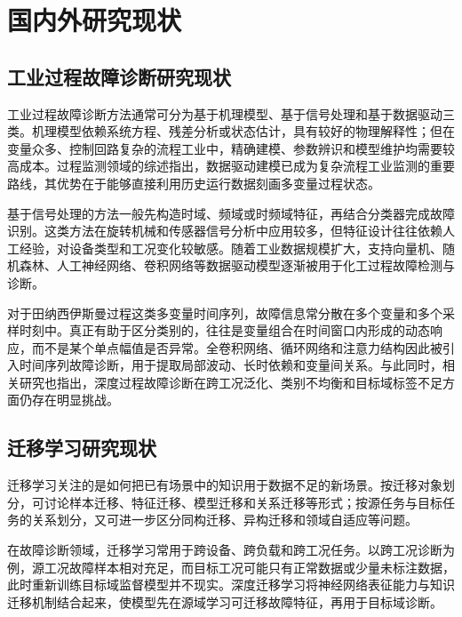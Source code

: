 \documentclass{seuthesis-2022}
\begin{document}
\section{国内外研究现状}

\subsection{工业过程故障诊断研究现状}

工业过程故障诊断方法通常可分为基于机理模型、基于信号处理和基于数据驱动三类。机理模型依赖系统方程、残差分析或状态估计，具有较好的物理解释性；但在变量众多、控制回路复杂的流程工业中，精确建模、参数辨识和模型维护均需要较高成本。过程监测领域的综述指出，数据驱动建模已成为复杂流程工业监测的重要路线，其优势在于能够直接利用历史运行数据刻画多变量过程状态\cite{qin2012survey,ge2017review}。

基于信号处理的方法一般先构造时域、频域或时频域特征，再结合分类器完成故障识别。这类方法在旋转机械和传感器信号分析中应用较多，但特征设计往往依赖人工经验，对设备类型和工况变化较敏感。随着工业数据规模扩大，支持向量机、随机森林、人工神经网络、卷积网络等数据驱动模型逐渐被用于化工过程故障检测与诊断\cite{lei2020applications,taqvi2021review,wang2025comprehensive}。

对于田纳西伊斯曼过程这类多变量时间序列，故障信息常分散在多个变量和多个采样时刻中。真正有助于区分类别的，往往是变量组合在时间窗口内形成的动态响应，而不是某个单点幅值是否异常。全卷积网络、循环网络和注意力结构因此被引入时间序列故障诊断，用于提取局部波动、长时依赖和变量间关系。与此同时，相关研究也指出，深度过程故障诊断在跨工况泛化、类别不均衡和目标域标签不足方面仍存在明显挑战\cite{yu2023challenges}。

\subsection{迁移学习研究现状}

迁移学习关注的是如何把已有场景中的知识用于数据不足的新场景。按迁移对象划分，可讨论样本迁移、特征迁移、模型迁移和关系迁移等形式；按源任务与目标任务的关系划分，又可进一步区分同构迁移、异构迁移和领域自适应等问题\cite{pan2009survey,li2022perspective}。

在故障诊断领域，迁移学习常用于跨设备、跨负载和跨工况任务。以跨工况诊断为例，源工况故障样本相对充足，而目标工况可能只有正常数据或少量未标注数据，此时重新训练目标域监督模型并不现实。深度迁移学习将神经网络表征能力与知识迁移机制结合起来，使模型先在源域学习可迁移故障特征，再用于目标域诊断\cite{li2022perspective}。
\end{document}
